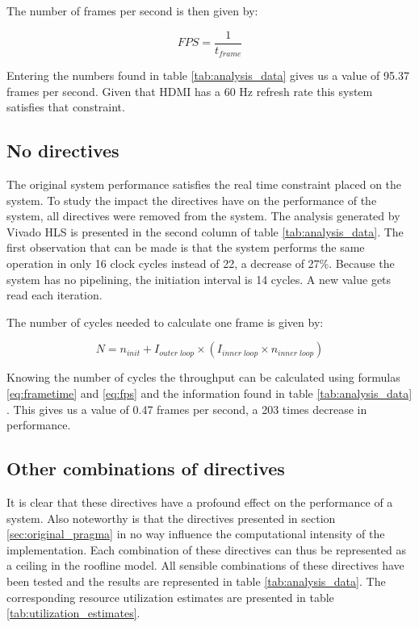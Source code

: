 The number of frames per second is then given by:

\begin{equation}\label{eq:fps}
FPS = \frac{1}{t_{frame}}
\end{equation}

Entering the numbers found in table \ref{tab:analysis_data} gives us a value of 95.37 frames per second. Given that HDMI has a 60 Hz refresh rate this system satisfies that constraint.


\subsection{No directives}
\label{sec:nopragma}

The original system performance satisfies the real time constraint placed on the system. To study the impact the directives have on the performance of the system, all directives were removed from the  system. The analysis generated by Vivado HLS is presented in the second column of table \ref{tab:analysis_data}. The first observation that can be made is that the system performs the same operation in only 16 clock cycles instead of 22, a decrease of 27\%. Because the system has no pipelining, the initiation interval is 14 cycles. A new value gets read each iteration.

The number of cycles needed to calculate one frame is given by:

\begin{equation}
N = n_{init} + I_{outer\;loop} \times (I_{inner\;loop} \times n_{inner\;loop})
\end{equation}



Knowing the number of cycles the throughput can be calculated using formulas \ref{eq:frametime} and \ref{eq:fps} and the information found in table \ref{tab:analysis_data} . This gives us a value of 0.47 frames per second, a 203 times decrease in performance.

\subsection{Other combinations of directives}

It is clear that these directives have a profound effect on the performance of a system. Also noteworthy is that the directives presented in section \ref{sec:original_pragma} in no way influence the computational intensity of the implementation. Each combination of these directives can thus be represented as a ceiling in the roofline model.
All sensible combinations of these directives have been tested and the results are represented in table  \ref{tab:analysis_data}. The corresponding resource utilization estimates are presented in table \ref{tab:utilization_estimates}.

